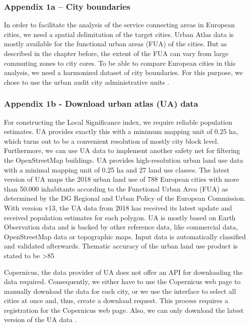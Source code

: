 \documentclass[10pt]{article}
\begin{document}
\subsubsection{Appendix 1a – City boundaries}
In order to facilitate the analysis of the service connecting areas in European cities, we need a spatial delimitation of the target cities. Urban Atlas data is mostly available for the functional urban areas (FUA) of the cities. But as described in the chapter before, the extent of the FUA can vary from large commuting zones to city cores. To be able to compare European cities in this analysis, we need a harmonized dataset of city boundaries. For this purpose, we chose to use the urban audit city administrative units \citep{EuropeanUnion.2020, UrbanAudit.2022}.


\subsubsection{Appendix 1b - Download urban atlas (UA) data}
For constructing the Local Significance index, we require reliable population estimates.
UA provides exactly this with a minimum mapping unit of 0.25 ha, which turns out to be a 	convenient resolution of mostly city block level. 	
Furthermore, we can use UA data to implement another safety net for filtering the 	OpenStreetMap buildings.
UA provides high-resolution urban land use data with a minimal mapping unit of 0.25 ha and 27 land use classes. The latest version of UA maps the 2018 urban land use of 788 European cities with more than 50.000 inhabitants according to the Functional Urban Area (FUA) as determined by the DG Regional and Urban Policy of the European Commission.  With version v13, the UA data from 2018 has received its latest update and received population estimates for each polygon. UA is mostly based on Earth Observation data and is backed by other reference data, like commercial data, OpenStreetMap data or topographic maps. Input data is automatically classified and validated afterwards. Thematic accuracy of the urban land use product is stated to be >85%

Copernicus, the data provider of UA does not offer an API for downloading the data required. Consequently, we either have to use the Copernicus web page to manually download the data for each city, or we use the interface to select all cities at once and, thus, create a download request. This process requires a registration for the Copernicus web page. Also, we 	can only download the latest version of the UA data \citep{EuropeanUnion.2020}.
\end{document}
